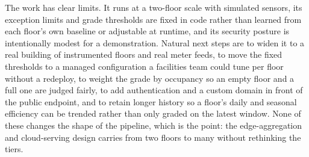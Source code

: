 \documentclass[conference]{IEEEtran}
\begin{document}
The work has clear limits. It runs at a two-floor scale with simulated sensors, its exception limits and grade thresholds are fixed in code rather than learned from each floor's own baseline or adjustable at runtime, and its security posture is intentionally modest for a demonstration. Natural next steps are to widen it to a real building of instrumented floors and real meter feeds, to move the fixed thresholds to a managed configuration a facilities team could tune per floor without a redeploy, to weight the grade by occupancy so an empty floor and a full one are judged fairly, to add authentication and a custom domain in front of the public endpoint, and to retain longer history so a floor's daily and seasonal efficiency can be trended rather than only graded on the latest window. None of these changes the shape of the pipeline, which is the point: the edge-aggregation and cloud-serving design carries from two floors to many without rethinking the tiers.
\end{document}
